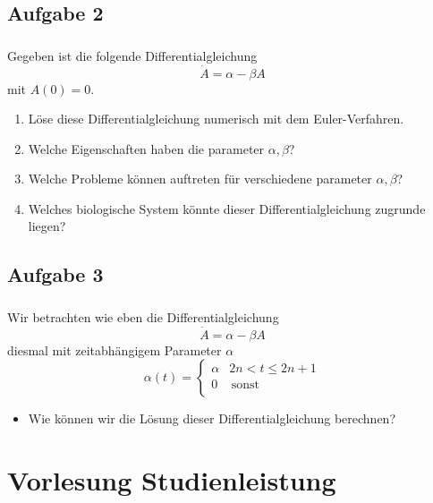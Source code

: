 \subsection{Aufgabe 2}
\label{subsec:exercise-1}
\begin{frame}
    \frametitle{\insertsubsection}
    Gegeben ist die folgende Differentialgleichung
    \[\dot{A} = \alpha - \beta A\]
    mit $A(0)=0$.
    \begin{enumerate}[<+->]
        \item Löse diese Differentialgleichung numerisch mit dem Euler-Verfahren.
        \item Welche Eigenschaften haben die parameter $\alpha,\beta$?
        \item Welche Probleme können auftreten für verschiedene parameter $\alpha,\beta$?
        \item Welches biologische System könnte dieser Differentialgleichung zugrunde liegen?
    \end{enumerate}

\end{frame}


\subsection{Aufgabe 3}
\label{subsec:exercise-1}
\begin{frame}
    \frametitle{\insertsubsection}
    Wir betrachten wie eben die Differentialgleichung
    \[\dot{A} = \alpha - \beta A\]
    diesmal mit zeitabhängigem Parameter $\alpha$
    \[\alpha(t) = \left\{\begin{array}{ll}
        \alpha & 2n < t \leq 2n+1 \\
        0 & \, \textrm{sonst} \\
        \end{array}\right.\]
    \begin{itemize}[<+->]
        \item Wie können wir die Lösung dieser Differentialgleichung berechnen?
    \end{itemize}
\end{frame}


\section{Vorlesung Studienleistung}
